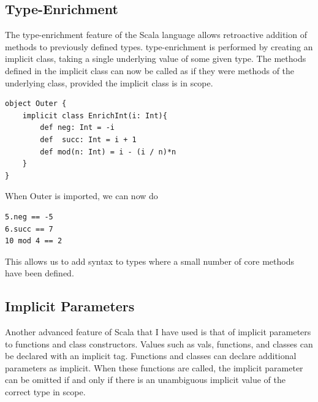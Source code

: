 \documentclass[12pt,a4paper,twoside,openright]{report}
\renewcommand{\baselinestretch}{1.1}    %
\begin{document}
\subsection{Type-Enrichment}
The type-enrichment feature of the Scala language allows retroactive addition of methods to previously defined types. type-enrichment is performed by creating an implicit class, taking a single underlying value of some given type. The methods defined in the implicit class can now be called as if they were methods of the underlying class, provided the implicit class is in scope.

\renewcommand{\baselinestretch}{0.8}
\begin{framed}
\begin{framed}
\begin{verbatim}
object Outer {
    implicit class EnrichInt(i: Int){
        def neg: Int = -i
        def  succ: Int = i + 1
        def mod(n: Int) = i - (i / n)*n
    }
}
\end{verbatim}
\end{framed}
\renewcommand{\baselinestretch}{1.1}
When Outer is imported, we can now do

\renewcommand{\baselinestretch}{0.8}
\begin{framed}
\begin{verbatim}
5.neg == -5
6.succ == 7
10 mod 4 == 2
\end{verbatim}
\end{framed}
\end{framed}
\renewcommand{\baselinestretch}{1.1}






This allows us to add syntax to types where a small number of core methods have been defined.

\subsection{Implicit Parameters}
Another advanced feature of Scala that  I have used is that of implicit  parameters to functions and class constructors. Values such as vals, functions, and classes can be declared with an implicit tag. Functions and classes can declare additional parameters as implicit. When these functions are called, the implicit parameter can be omitted if and only if there is an unambiguous implicit value of the correct type in scope.
\end{document}
